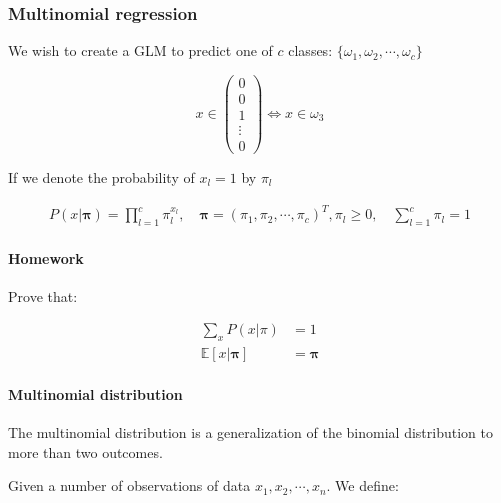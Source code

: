 \subsubsection{Multinomial regression}

We wish to create a GLM to predict one of $c$ classes: $\{ \omega_1, \omega_2, \cdots, \omega_c\}$

\begin{equation}
  x \in \begin{pmatrix}
    0 \\
    0 \\
    1 \\
    \vdots \\
    0
  \end{pmatrix} \Longleftrightarrow x \in \omega_3
  \tag {one-hot encoding}
\end{equation}

If we denote the probability of $x_l = 1$ by $\pi_l$

\begin{align*}
  P(x | \boldsymbol\pi) = \prod_{l=1}^c \pi_l^{x_l},\quad
  \boldsymbol{\pi} = (\pi_1, \pi_2, \cdots, \pi_c)^T,
  \pi_l \geq 0,\quad \sum_{l=1}^c \pi_l = 1
\end{align*}

\paragraph{Homework} Prove that:

\begin{align*}
  \sum_x P(x | \pi) &= 1 \\
  \mathds{E}[x | \boldsymbol\pi] &= \boldsymbol\pi
\end{align*}

\paragraph{Multinomial distribution}
The multinomial distribution is a generalization of the binomial distribution to more than two outcomes.

Given a number of observations of data $x_1, x_2, \cdots, x_n$. We define:



